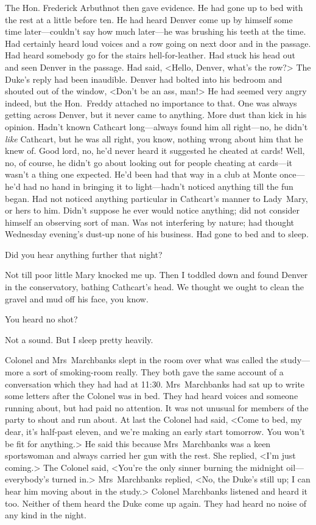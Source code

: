 The Hon. Frederick Arbuthnot then gave evidence. He had gone up to bed with the rest at a little before ten. He had heard Denver come up by himself some time later—couldn't say how much later—he was brushing his teeth at the time.  Had certainly heard loud voices and a row going on next door and in the passage. Had heard somebody go for the stairs hell-for-leather. Had stuck his head out and seen Denver in the passage. Had said, <Hello, Denver, what's the row?> The Duke's reply had been inaudible. Denver had bolted into his bedroom and shouted out of the window, <Don't be an ass, man!> He had seemed very angry indeed, but the Hon.~Freddy attached no importance to that.  One was always getting across Denver, but it never came to anything.  More dust than kick in his opinion. Hadn't known Cathcart long—always found him all right—no, he didn't \emph{like} Cathcart, but he was all right, you know, nothing wrong about him that he knew of. Good lord, no, he'd never heard it suggested he cheated at cards! Well, no, of course, he didn't go about looking out for people cheating at cards—it wasn't a thing one expected. He'd been had that way in a club at Monte once—he'd had no hand in bringing it to light—hadn't noticed anything till the fun began. Had not noticed anything particular in Cathcart's manner to Lady~Mary, or hers to him. Didn't suppose he ever would notice anything; did not consider himself an observing sort of man. Was not interfering by nature; had thought Wednesday evening's dust-up none of his business. Had gone to bed and to sleep.

\begin{dialogue}

 Did you hear anything further that night?

 Not till poor little Mary knocked me up. Then I toddled down and found Denver in the conservatory, bathing Cathcart's head. We thought we ought to clean the gravel and mud off his face, you know.

 You heard no shot?

 Not a sound. But I sleep pretty heavily.
\end{dialogue}

Colonel and Mrs~Marchbanks slept in the room over what was called the study—more a sort of smoking-room really. They both gave the same account of a conversation which they had had at 11:30. Mrs~Marchbanks had sat up to write some letters after the Colonel was in bed. They had heard voices and someone running about, but had paid no attention.  It was not unusual for members of the party to shout and run about.  At last the Colonel had said, <Come to bed, my dear, it's half-past eleven, and we're making an early start tomorrow. You won't be fit for anything.> He said this because Mrs~Marchbanks was a keen sportswoman and always carried her gun with the rest. She replied, <I'm just coming.> The Colonel said, <You're the only sinner burning the midnight oil—everybody's turned in.> Mrs~Marchbanks replied, <No, the Duke's still up; I can hear him moving about in the study.> Colonel Marchbanks listened and heard it too. Neither of them heard the Duke come up again. They had heard no noise of any kind in the night.

